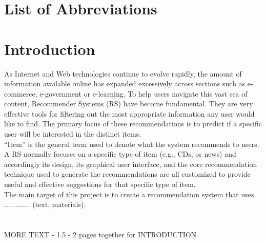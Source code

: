 \documentclass[10pt,oneside,english,a4paper]{article}
\begin{document}

\newpage{} 

\setcounter{page}{6}
\tableofcontents
\newpage{}
\listoffigures
\listoftables
\section*{List of Abbreviations}

\clearpage{} 
\setcounter{page}{1}

\section{Introduction}
As Internet and Web technologies continue to evolve rapidly, the amount of information available online has expanded excessively across sections such as e-commerce, e-government or e-learning. To help users navigate this vast sea of content, Recommender Systems (RS) have become fundamental. They are very effective tools for filtering out the most appropriate information any user would like to find. The primary focus of these recommendations is to predict if a specific user will be interested in the distinct items.\\

“Item” is the general term used to denote what the system recommends to users. A RS normally focuses on a specific type of item (e.g., CDs, or news) and accordingly its design, its graphical user interface, and the core recommendation technique used to generate the recommendations are all customized to provide useful and effective suggestions for that specific type of item. \cite{pub.1036183961}\\



The main target of this project is to create a recommendation system that uses ............. (text, materials).\\\\\\
MORE TEXT - 1.5 - 2 pages together for INTRODUCTION\\





\clearpage{}
\end{document}
